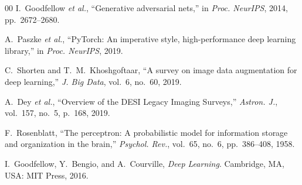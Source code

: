 \documentclass[conference]{IEEEtran}
\begin{document}
\begin{thebibliography}{00}
I.~Goodfellow \emph{et al.}, ``Generative adversarial nets,'' in \emph{Proc. NeurIPS}, 2014, pp.~2672--2680.

A.~Paszke \emph{et al.}, ``PyTorch: An imperative style, high-performance deep learning library,'' in \emph{Proc. NeurIPS}, 2019.

C.~Shorten and T.~M.~Khoshgoftaar, ``A survey on image data augmentation for deep learning,'' \emph{J. Big Data}, vol.~6, no.~60, 2019.

A.~Dey \emph{et al.}, ``Overview of the DESI Legacy Imaging Surveys,'' \emph{Astron. J.}, vol.~157, no.~5, p.~168, 2019.

F.~Rosenblatt, ``The perceptron: A probabilistic model for information storage and organization in the brain,'' \emph{Psychol. Rev.}, vol.~65, no.~6, pp.~386--408, 1958.

I.~Goodfellow, Y.~Bengio, and A.~Courville, \emph{Deep Learning}. Cambridge, MA, USA: MIT Press, 2016.
\end{thebibliography}
\end{document}
